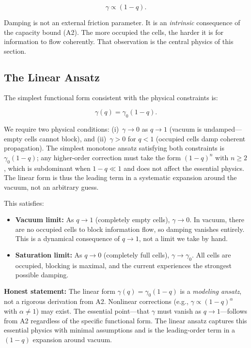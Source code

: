 \documentclass[aps,prd,twocolumn,showpacs,superscriptaddress,preprintnumbers]{revtex4-2}
\begin{document}
\begin{equation}
\gamma \propto (1-q).
\label{eq:gamma_scaling}
\end{equation}

Damping is not an external friction parameter.
It is an \emph{intrinsic} consequence of the capacity bound (A2).
The more occupied the cells, the harder it is for information to flow coherently.
That observation is the central physics of this section.

\subsection{The Linear Ansatz}

The simplest functional form consistent with the physical constraints is:

\begin{equation}
\boxed{\gamma(q) = \gamma_0 (1-q)}.
\label{eq:gamma_linear}
\end{equation}

We require two physical conditions: (i)~$\gamma\to0$ as $q\to1$ (vacuum is undamped---empty cells cannot block), and (ii)~$\gamma>0$ for $q<1$ (occupied cells damp coherent propagation). The simplest monotone ansatz satisfying both constraints is $\gamma_0(1-q)$; any higher-order correction must take the form $(1-q)^n$ with $n\ge2$, which is subdominant when $1-q\ll1$ and does not affect the essential physics. The linear form is thus the leading term in a systematic expansion around the vacuum, not an arbitrary guess.

This satisfies:

\begin{itemize}
    \item \textbf{Vacuum limit:} As $q\to 1$ (completely empty cells), $\gamma\to 0$. In vacuum, there are no occupied cells to block information flow, so damping vanishes entirely. This is a dynamical consequence of $q\to 1$, not a limit we take by hand.
    \item \textbf{Saturation limit:} As $q\to 0$ (completely full cells), $\gamma\to\gamma_0$. All cells are occupied, blocking is maximal, and the current experiences the strongest possible damping.
\end{itemize}

\textbf{Honest statement:} The linear form $\gamma(q)=\gamma_0(1-q)$ is a \emph{modeling ansatz}, not a rigorous derivation from A2.
Nonlinear corrections (e.g., $\gamma\propto(1-q)^\alpha$ with $\alpha\neq 1$) may exist.
The essential point---that $\gamma$ must vanish as $q\to 1$---follows from A2 regardless of the specific functional form.
The linear ansatz captures this essential physics with minimal assumptions and is the leading-order term in a $(1-q)$ expansion around vacuum.
\end{document}
